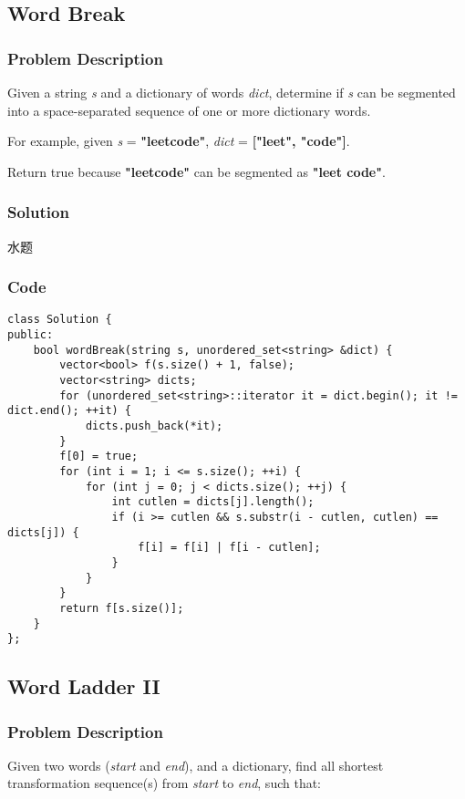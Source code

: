 \documentclass[courier]{article}
\begin{document}
\begin{CJK*}{UTF8}{gkai}
\subsection{ Word Break }

\subsubsection*{Problem Description}
Given a string \emph{s} and a dictionary of words \emph{dict}, determine if \emph{s} can be segmented into a space-separated sequence of one or more dictionary words.

For example, given
\emph{s} = \textbf{"leetcode"},
\emph{dict} = \textbf{["leet", "code"]}.

Return true because \textbf{"leetcode"} can be segmented as \textbf{"leet code"}.



\subsubsection*{Solution}
水题

\subsubsection*{Code}
\begin{lstlisting}
class Solution {
public:
    bool wordBreak(string s, unordered_set<string> &dict) {
        vector<bool> f(s.size() + 1, false);
        vector<string> dicts;
        for (unordered_set<string>::iterator it = dict.begin(); it != dict.end(); ++it) {
            dicts.push_back(*it);
        }
        f[0] = true;
        for (int i = 1; i <= s.size(); ++i) {
            for (int j = 0; j < dicts.size(); ++j) {
                int cutlen = dicts[j].length();
                if (i >= cutlen && s.substr(i - cutlen, cutlen) == dicts[j]) {
                    f[i] = f[i] | f[i - cutlen];
                }
            }
        }
        return f[s.size()];
    }
}; 
\end{lstlisting}


\subsection{ Word Ladder II }

\subsubsection*{Problem Description}
Given two words (\emph{start} and \emph{end}), and a dictionary, find all shortest transformation sequence(s) from \emph{start} to \emph{end}, such that:


\end{CJK*}
\end{document}
